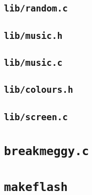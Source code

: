 \documentclass[a4paper,10pt]{article}
\begin{document}
\subsection{\texttt{lib/random.c}}


\subsection{\texttt{lib/music.h}}


\subsection{\texttt{lib/music.c}}


\subsection{\texttt{lib/colours.h}}


\subsection{\texttt{lib/screen.c}}


\section{\texttt{breakmeggy.c}}



\section{\texttt{makeflash}}


\end{document}
